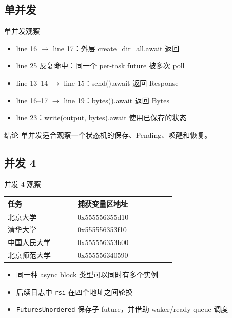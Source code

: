 \documentclass[aspectratio=169,11pt]{beamer}
\begin{document}
\subsection{单并发}

\begin{frame}{单并发观察}
  \begin{itemize}
    \item line 16 $\rightarrow$ line 17：外层 create\_dir\_all.await 返回
    \item line 25 反复命中：同一个 per-task future 被多次 poll
    \item line 13--14 $\rightarrow$ line 15：send().await 返回 Response
    \item line 16--17 $\rightarrow$ line 19：bytes().await 返回 Bytes
    \item line 23：write(output, bytes).await 使用已保存的状态
  \end{itemize}

  \begin{block}{结论}
    单并发适合观察一个状态机的保存、Pending、唤醒和恢复。
  \end{block}
\end{frame}

\subsection{并发 4}

\begin{frame}{并发 4 观察}
  \begin{tabular}{>{\raggedright\arraybackslash}p{0.30\linewidth}>{\ttfamily}p{0.42\linewidth}}
    \toprule
    任务 & 捕获变量区地址 \\
    \midrule
    北京大学 & 0x555556355d10 \\
    清华大学 & 0x555556353f10 \\
    中国人民大学 & 0x555556353b00 \\
    北京师范大学 & 0x555556340590 \\
    \bottomrule
  \end{tabular}

  \vspace{0.8em}
  \begin{itemize}
    \item 同一种 async block 类型可以同时有多个实例
    \item 后续日志中 \texttt{rsi} 在四个地址之间轮换
    \item \texttt{FuturesUnordered} 保存子 future，并借助 waker/ready queue 调度
  \end{itemize}
\end{frame}
\end{document}
